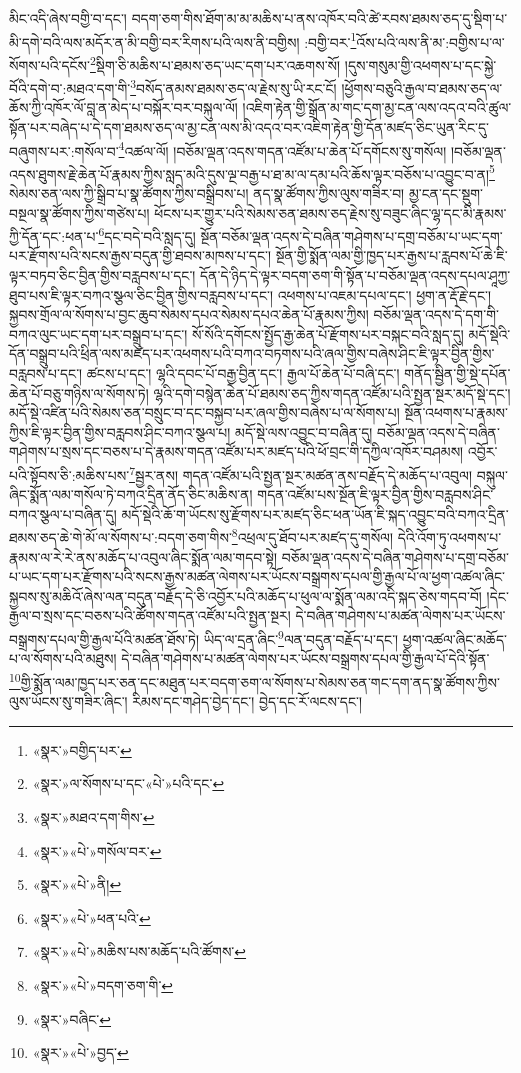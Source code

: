 མིང་འདི་ཞེས་བགྱི་བ་དང་། བདག་ཅག་གིས་ཐོག་མ་མ་མཆིས་པ་ནས་འཁོར་བའི་ཚེ་རབས་ཐམས་ཅད་དུ་སྡིག་པ་མི་དགེ་བའི་ལས་མདོར་ན་མི་བགྱི་བར་རིགས་པའི་ལས་ནི་བགྱིས། :བགྱི་བར་\footnote{«སྣར་»བགྱིད་པར་}འོས་པའི་ལས་ནི་མ་:བགྱིས་པ་ལ་སོགས་པའི་དངོས་\footnote{«སྣར་»ལ་སོགས་པ་དང་«པེ་»པའི་དང་}སྡིག་ཅི་མཆིས་པ་ཐམས་ཅད་ཡང་དག་པར་འཆགས་སོ། །དུས་གསུམ་གྱི་འཕགས་པ་དང་སྐྱེ་བོའི་དགེ་བ་:མཐའ་དག་གི་\footnote{«སྣར་»མཐའ་དག་གིས་}བསོད་ནམས་ཐམས་ཅད་ལ་རྗེས་སུ་ཡི་རང་ངོ། །ཕྱོགས་བཅུའི་རྒྱལ་བ་ཐམས་ཅད་ལ་ཆོས་ཀྱི་འཁོར་ལོ་བླ་ན་མེད་པ་བསྐོར་བར་བསྐུལ་ལོ། །འཇིག་རྟེན་གྱི་སྒྲོན་མ་གང་དག་མྱ་ངན་ལས་འདའ་བའི་ཚུལ་སྟོན་པར་བཞེད་པ་དེ་དག་ཐམས་ཅད་ལ་མྱ་ངན་ལས་མི་འདའ་བར་འཇིག་རྟེན་གྱི་དོན་མཛད་ཅིང་ཡུན་རིང་དུ་བཞུགས་པར་:གསོལ་བ་\footnote{«སྣར་»«པེ་»གསོལ་བར་}འཚལ་ལོ། །བཅོམ་ལྡན་འདས་གདན་འཛོམ་པ་ཆེན་པོ་དགོངས་སུ་གསོལ། །བཅོམ་ལྡན་འདས་ཐུགས་རྗེ་ཆེན་པོ་རྣམས་ཀྱིས་སླད་མའི་དུས་ལྔ་བརྒྱ་པ་ཐ་མ་ལ་དམ་པའི་ཆོས་ལྟར་བཅོས་པ་འབྱུང་བ་ན།\footnote{«སྣར་»«པེ་»ནི།} སེམས་ཅན་ལས་ཀྱི་སྒྲིབ་པ་སྣ་ཚོགས་ཀྱིས་བསྒྲིབས་པ། ནད་སྣ་ཚོགས་ཀྱིས་ལུས་གཟིར་བ། མྱ་ངན་དང་སྡུག་བསྔལ་སྣ་ཚོགས་ཀྱིས་གཙེས་པ། ཕོངས་པར་གྱུར་པའི་སེམས་ཅན་ཐམས་ཅད་རྗེས་སུ་བཟུང་ཞིང་ལྷ་དང་མི་རྣམས་ཀྱི་དོན་དང་:ཕན་པ་\footnote{«སྣར་»«པེ་»ཕན་པའི་}དང་བདེ་བའི་སླད་དུ། སྔོན་བཅོམ་ལྡན་འདས་དེ་བཞིན་གཤེགས་པ་དགྲ་བཅོམ་པ་ཡང་དག་པར་རྫོགས་པའི་སངས་རྒྱས་བདུན་གྱི་ཐབས་མཁས་པ་དང་། སྔོན་གྱི་སྨོན་ལམ་གྱི་ཁྱད་པར་རྒྱས་པ་རླབས་པོ་ཆེ་ཇི་ལྟར་བཏབ་ཅིང་བྱིན་གྱིས་བརླབས་པ་དང་། དོན་དེ་ཉིད་དེ་ལྟར་བདག་ཅག་གི་སྟོན་པ་བཅོམ་ལྡན་འདས་དཔལ་ཤཱཀྱ་ཐུབ་པས་ཇི་ལྟར་བཀའ་སྩལ་ཅིང་བྱིན་གྱིས་བརླབས་པ་དང་། འཕགས་པ་འཇམ་དཔལ་དང་། ཕྱག་ན་རྡོ་རྗེ་དང་། སྐྱབས་གྲོལ་ལ་སོགས་པ་བྱང་ཆུབ་སེམས་དཔའ་སེམས་དཔའ་ཆེན་པོ་རྣམས་ཀྱིས། བཅོམ་ལྡན་འདས་དེ་དག་གི་བཀའ་ལུང་ཡང་དག་པར་བསྒྲུབ་པ་དང་། སོ་སོའི་དགོངས་སྤྱོད་རྒྱ་ཆེན་པོ་རྫོགས་པར་བསྐང་བའི་སླད་དུ། མདོ་སྡེའི་དོན་བསྒྲུབ་པའི་ཕྲིན་ལས་མཛད་པར་འཕགས་པའི་བཀའ་བཏགས་པའི་ཞལ་གྱིས་བཞེས་ཤིང་ཇི་ལྟར་བྱིན་གྱིས་བརླབས་པ་དང་། ཚངས་པ་དང་། ལྷའི་དབང་པོ་བརྒྱ་བྱིན་དང་། རྒྱལ་པོ་ཆེན་པོ་བཞི་དང་། གནོད་སྦྱིན་གྱི་སྡེ་དཔོན་ཆེན་པོ་བཅུ་གཉིས་ལ་སོགས་ཏེ། ལྷའི་དགེ་བསྙེན་ཆེན་པོ་ཐམས་ཅད་ཀྱིས་གདན་འཛོམ་པའི་སྤྱན་སྔར་མདོ་སྡེ་དང་། མདོ་སྡེ་འཛིན་པའི་སེམས་ཅན་བསྲུང་བ་དང་བསྐྱབ་པར་ཞལ་གྱིས་བཞེས་པ་ལ་སོགས་པ། སྔོན་འཕགས་པ་རྣམས་ཀྱིས་ཇི་ལྟར་བྱིན་གྱིས་བརླབས་ཤིང་བཀའ་སྩལ་པ། མདོ་སྡེ་ལས་འབྱུང་བ་བཞིན་དུ། བཅོམ་ལྡན་འདས་དེ་བཞིན་གཤེགས་པ་སྲས་དང་བཅས་པ་དེ་རྣམས་གདན་འཛོམ་པར་མཛད་པའི་ཕོ་བྲང་གི་དཀྱིལ་འཁོར་བཤམས། འབྱོར་པའི་སྟོབས་ཅི་:མཆིས་པས་\footnote{«སྣར་»«པེ་»མཆིས་པས་མཆོད་པའི་ཚོགས་}སྦྱར་ནས། གདན་འཛོམ་པའི་སྤྱན་སྔར་མཚན་ནས་བརྗོད་དེ་མཆོད་པ་འབུལ། བསྐུལ་ཞིང་སྨོན་ལམ་གསོལ་ཏེ་བཀའ་དྲིན་ནོད་ཅིང་མཆིས་ན། གདན་འཛོམ་པས་སྔོན་ཇི་ལྟར་བྱིན་གྱིས་བརླབས་ཤིང་བཀའ་སྩལ་པ་བཞིན་དུ། མདོ་སྡེའི་ཆོ་ག་ཡོངས་སུ་རྫོགས་པར་མཛད་ཅིང་ཕན་ཡོན་ཇི་སྐད་འབྱུང་བའི་བཀའ་དྲིན་ཐམས་ཅད་ཆེ་གེ་མོ་ལ་སོགས་པ་:བདག་ཅག་གིས་\footnote{«སྣར་»«པེ་»བདག་ཅག་གི་}འཕྲལ་དུ་ཐོབ་པར་མཛད་དུ་གསོལ། དེའི་འོག་ཏུ་འཕགས་པ་རྣམས་ལ་རེ་རེ་ནས་མཆོད་པ་འབུལ་ཞིང་སྨོན་ལམ་གདབ་སྟེ། བཅོམ་ལྡན་འདས་དེ་བཞིན་གཤེགས་པ་དགྲ་བཅོམ་པ་ཡང་དག་པར་རྫོགས་པའི་སངས་རྒྱས་མཚན་ལེགས་པར་ཡོངས་བསྒྲགས་དཔལ་གྱི་རྒྱལ་པོ་ལ་ཕྱག་འཚལ་ཞིང་སྐྱབས་སུ་མཆིའོ་ཞེས་ལན་བདུན་བརྗོད་དེ་ཅི་འབྱོར་པའི་མཆོད་པ་ཕུལ་ལ་སྨོན་ལམ་འདི་སྐད་ཅེས་གདབ་བོ། །དེང་རྒྱལ་བ་སྲས་དང་བཅས་པའི་ཚོགས་གདན་འཛོམ་པའི་སྤྱན་སྔར། དེ་བཞིན་གཤེགས་པ་མཚན་ལེགས་པར་ཡོངས་བསྒྲགས་དཔལ་གྱི་རྒྱལ་པོའི་མཚན་ཐོས་ཏེ། ཡིད་ལ་དྲན་ཞིང་\footnote{«སྣར་»བཞིང་}ལན་བདུན་བརྗོད་པ་དང་། ཕྱག་འཚལ་ཞིང་མཆོད་པ་ལ་སོགས་པའི་མཐུས། དེ་བཞིན་གཤེགས་པ་མཚན་ལེགས་པར་ཡོངས་བསྒྲགས་དཔལ་གྱི་རྒྱལ་པོ་དེའི་སྟོན་\footnote{«སྣར་»«པེ་»བྱད་}གྱི་སྨོན་ལམ་ཁྱད་པར་ཅན་དང་མཐུན་པར་བདག་ཅག་ལ་སོགས་པ་སེམས་ཅན་གང་དག་ནད་སྣ་ཚོགས་ཀྱིས་ལུས་ཡོངས་སུ་གཟིར་ཞིང་། རིམས་དང་གཤེད་བྱེད་དང་། བྱེད་དང་རོ་ལངས་དང་། 